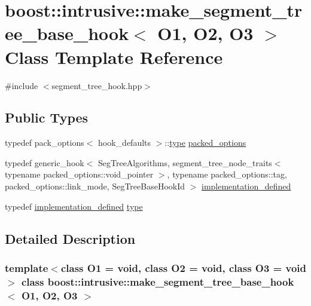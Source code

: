 \hypertarget{classboost_1_1intrusive_1_1make__segment__tree__base__hook}{}\section{boost\+:\+:intrusive\+:\+:make\+\_\+segment\+\_\+tree\+\_\+base\+\_\+hook$<$ O1, O2, O3 $>$ Class Template Reference}
\label{classboost_1_1intrusive_1_1make__segment__tree__base__hook}


{\ttfamily \#include $<$segment\+\_\+tree\+\_\+hook.\+hpp$>$}

\subsection*{Public Types}
\begin{DoxyCompactItemize}
\item 
typedef pack\+\_\+options$<$ hook\+\_\+defaults $>$\+::\hyperlink{classboost_1_1intrusive_1_1make__segment__tree__base__hook_a9c140e02f782596cc309f211a16125ab}{type} \hyperlink{classboost_1_1intrusive_1_1make__segment__tree__base__hook_a98fb49751f922d9d2bd29b788fae7de6}{packed\+\_\+options}
\item 
typedef generic\+\_\+hook$<$ Seg\+Tree\+Algorithms, segment\+\_\+tree\+\_\+node\+\_\+traits$<$ typename packed\+\_\+options\+::void\+\_\+pointer $>$, typename packed\+\_\+options\+::tag, packed\+\_\+options\+::link\+\_\+mode, Seg\+Tree\+Base\+Hook\+Id $>$ \hyperlink{classboost_1_1intrusive_1_1make__segment__tree__base__hook_ac9e2687ae1be3fafd1465686917f339b}{implementation\+\_\+defined}
\item 
typedef \hyperlink{classboost_1_1intrusive_1_1make__segment__tree__base__hook_ac9e2687ae1be3fafd1465686917f339b}{implementation\+\_\+defined} \hyperlink{classboost_1_1intrusive_1_1make__segment__tree__base__hook_a9c140e02f782596cc309f211a16125ab}{type}
\end{DoxyCompactItemize}


\subsection{Detailed Description}
\subsubsection*{template$<$class O1 = void, class O2 = void, class O3 = void$>$\newline
class boost\+::intrusive\+::make\+\_\+segment\+\_\+tree\+\_\+base\+\_\+hook$<$ O1, O2, O3 $>$}

